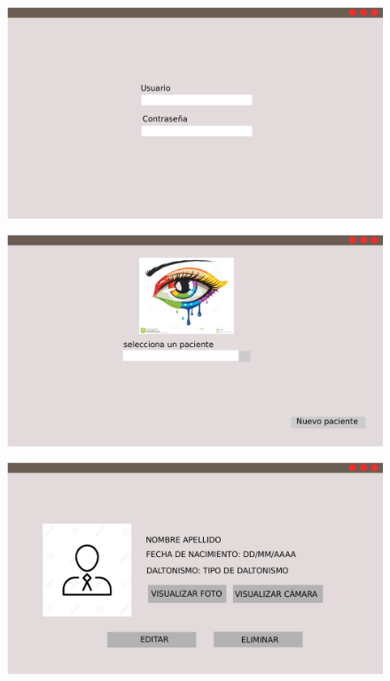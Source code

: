 \documentclass[10pt]{article}
\begin{document}
\begin{figure}[H]
	\begin{center}
\includegraphics[scale = 0.20]{Imagenes/login.png}
	\end{center} 
\end{figure}

\begin{figure}[H]
	\begin{center}
\includegraphics[scale = 0.20]{Imagenes/Ventana2.png}
	\end{center} 
\end{figure}
\newpage


\begin{figure}[H]
	\begin{center}
\includegraphics[scale = 0.20]{Imagenes/Ventana3.png}
	\end{center} 
\end{figure}
\end{document}
